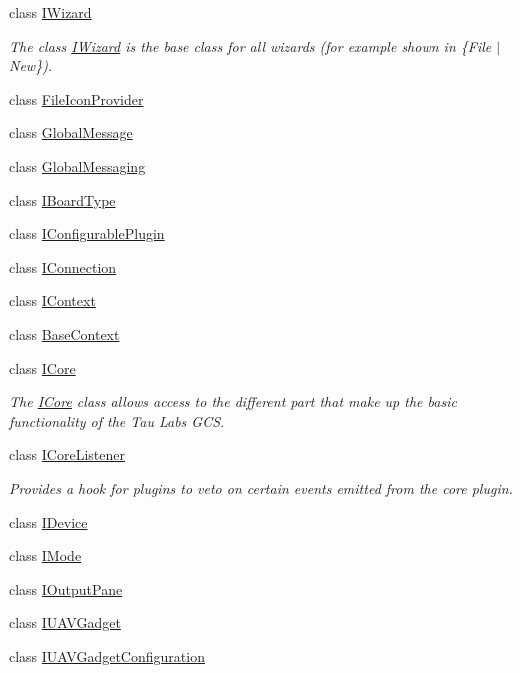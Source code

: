 \begin{DoxyCompactItemize}
class \hyperlink{class_core_1_1_i_wizard}{\-I\-Wizard}
\begin{DoxyCompactList}\small\item\em \-The class \hyperlink{class_core_1_1_i_wizard}{\-I\-Wizard} is the base class for all wizards (for example shown in  \{\-File $|$ \-New\}). \end{DoxyCompactList}\item 
class \hyperlink{class_core_1_1_file_icon_provider}{\-File\-Icon\-Provider}
\item 
class \hyperlink{class_core_1_1_global_message}{\-Global\-Message}
\item 
class \hyperlink{class_core_1_1_global_messaging}{\-Global\-Messaging}
\item 
class \hyperlink{class_core_1_1_i_board_type}{\-I\-Board\-Type}
\item 
class \hyperlink{class_core_1_1_i_configurable_plugin}{\-I\-Configurable\-Plugin}
\item 
class \hyperlink{class_core_1_1_i_connection}{\-I\-Connection}
\item 
class \hyperlink{class_core_1_1_i_context}{\-I\-Context}
\item 
class \hyperlink{class_core_1_1_base_context}{\-Base\-Context}
\item 
class \hyperlink{class_core_1_1_i_core}{\-I\-Core}
\begin{DoxyCompactList}\small\item\em \-The \hyperlink{class_core_1_1_i_core}{\-I\-Core} class allows access to the different part that make up the basic functionality of the \-Tau \-Labs \-G\-C\-S. \end{DoxyCompactList}\item 
class \hyperlink{class_core_1_1_i_core_listener}{\-I\-Core\-Listener}
\begin{DoxyCompactList}\small\item\em \-Provides a hook for plugins to veto on certain events emitted from the core plugin. \end{DoxyCompactList}\item 
class \hyperlink{class_core_1_1_i_device}{\-I\-Device}
\item 
class \hyperlink{class_core_1_1_i_mode}{\-I\-Mode}
\item 
class \hyperlink{class_core_1_1_i_output_pane}{\-I\-Output\-Pane}
\item 
class \hyperlink{class_core_1_1_i_u_a_v_gadget}{\-I\-U\-A\-V\-Gadget}
\item 
class \hyperlink{class_core_1_1_i_u_a_v_gadget_configuration}{\-I\-U\-A\-V\-Gadget\-Configuration}

\end{DoxyCompactItemize}

